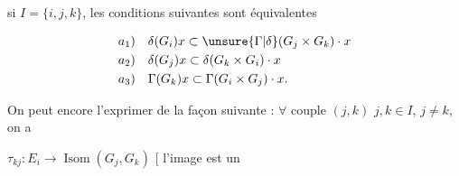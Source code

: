 si $I=\{i,j,k\}$, les conditions suivantes sont équivalentes


\[
\begin{aligned}
a_1)&\quad\delta(G_i)x\subset\unsure{\Gamma|\delta}(G_j\times G_k)\cdot x\\
a_2)&\quad\delta(G_j)x\subset\delta(G_k\times G_i)\cdot x\\
a_3)&\quad\Gamma(G_k)x\subset\Gamma(G_i\times G_j)\cdot x .
\end{aligned}
\]

 On peut encore l'exprimer de la façon suivante : $\forall$ couple $(j,k)$  $j,k\in I$, $j\ne k$, on a

$\tau_{kj}\colon E_i\to\operatorname{Isom}(G_j,G_k)$ \quad [ l'image est un
